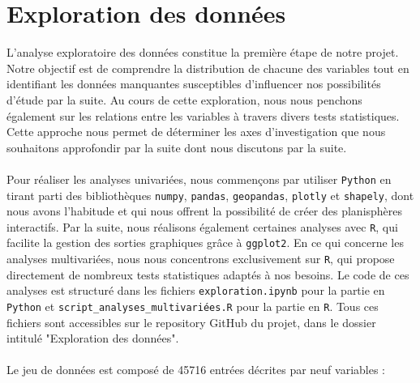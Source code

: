 \documentclass[12pt]{article}
\begin{document}
\section{Exploration des données}
L'analyse exploratoire des données constitue la première étape de notre projet. Notre objectif est de comprendre la distribution de chacune des variables tout en identifiant les données manquantes susceptibles d'influencer nos possibilités d'étude par la suite. Au cours de cette exploration, nous nous penchons également sur les relations entre les variables à travers divers tests statistiques. Cette approche nous permet de déterminer les axes d'investigation que nous souhaitons approfondir par la suite dont nous discutons par la suite.\\
\\
Pour réaliser les analyses univariées, nous commençons par utiliser \texttt{Python} en tirant parti des bibliothèques \texttt{numpy}, \texttt{pandas}, \texttt{geopandas}, \texttt{plotly} et \texttt{shapely}, dont nous avons l'habitude et qui nous offrent la possibilité de créer des planisphères interactifs. Par la suite, nous réalisons également certaines analyses avec \texttt{R}, qui facilite la gestion des sorties graphiques grâce à \texttt{ggplot2}. En ce qui concerne les analyses multivariées, nous nous concentrons exclusivement sur \texttt{R}, qui propose directement de nombreux tests statistiques adaptés à nos besoins. Le code de ces analyses est structuré dans les fichiers \texttt{exploration.ipynb} pour la partie en \texttt{Python} et \texttt{script\_analyses\_multivariées.R} pour la partie en \texttt{R}. Tous ces fichiers sont accessibles sur le repository GitHub du projet, dans le dossier intitulé "Exploration des données".\\
\\
Le jeu de données est composé de 45716 entrées décrites par neuf variables :
\end{document}
